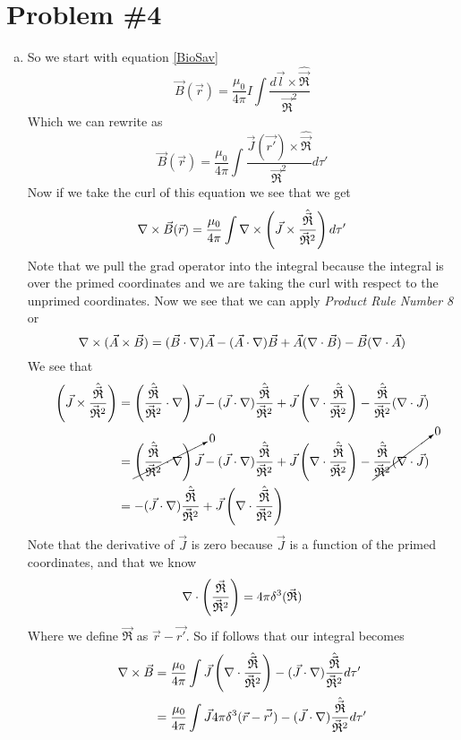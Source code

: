 \documentclass[11pt]{article}
\numberwithin{equation}{section}
\newcommand{\grad}{\bold\nabla}
\newcommand{\scrptR}{\vec{\mathfrak{R}}}
\begin{document}
\section{Problem \#4}
\begin{enumerate}[(a)]
\item
So we start with equation \ref{BioSav}
$$\vec{B}(\vec{r}) = \frac{\mu_0}{4\pi} I\int \frac{d\vec{l}\times\hat{\scrptR}}{\scrptR^2}$$
Which we can rewrite as
$$\vec{B}(\vec{r}) = \frac{\mu_0}{4\pi}\int\frac{\vec{J}(\vec{r'})\times\hat{\scrptR}}{\scrptR^2}d\tau'$$
Now if we take the curl of this equation we see that we get 
$$\grad\times\vec{B}(\vec{r}) = \frac{\mu_0}{4\pi}\int\grad\times\left(\vec{J}\times\frac{\hat{\scrptR}}{\scrptR^2}\right)d\tau'$$
Note that we pull the grad operator into the integral because the integral is over the primed coordinates and we are taking the curl with respect to the unprimed coordinates. Now we see that we can apply \emph{Product Rule Number 8} or
$$\grad\times(\vec{A}\times\vec{B}) = (\vec{B}\cdot\grad)\vec{A}-(\vec{A}\cdot\grad)\vec{B} + \vec{A}(\grad\cdot\vec{B})-\vec{B}(\grad\cdot\vec{A})$$
We see that
\begin{align*}
\left(\vec{J}\times\frac{\hat{\scrptR}}{\scrptR^2}\right) &= \left(\frac{\hat{\scrptR}}{\scrptR^2}\cdot\grad\right)\vec{J}-(\vec{J}\cdot\grad)\frac{\hat{\scrptR}}{\scrptR^2} + \vec{J}\left(\grad\cdot\frac{\hat{\scrptR}}{\scrptR^2}\right)-\frac{\hat{\scrptR}}{\scrptR^2}(\grad\cdot\vec{J})\\
&= \cancelto{0}{\left(\frac{\hat{\scrptR}}{\scrptR^2}\cdot\grad\right)\vec{J}}-(\vec{J}\cdot\grad)\frac{\hat{\scrptR}}{\scrptR^2} + \vec{J}\left(\grad\cdot\frac{\hat{\scrptR}}{\scrptR^2}\right)-\cancelto{0}{\frac{\hat{\scrptR}}{\scrptR^2}(\grad\cdot\vec{J})}\\
&= -(\vec{J}\cdot\grad)\frac{\hat{\scrptR}}{\scrptR^2} + \vec{J}\left(\grad\cdot\frac{\hat{\scrptR}}{\scrptR^2}\right)
\end{align*}
Note that the derivative of $\vec{J}$ is zero because $\vec{J}$ is a function of the primed coordinates, and that we know
$$\grad\cdot\left(\frac{\scrptR}{\scrptR^2}\right) = 4\pi\delta^3(\scrptR)$$
Where we define $\scrptR$ as $\vec{r} - \vec{r'}$. So if follows that our integral becomes
\begin{align*}
\grad\times\vec{B} &= \frac{\mu_0}{4\pi}\int \vec{J}\left(\grad\cdot\frac{\hat{\scrptR}}{\scrptR^2}\right)-(\vec{J}\cdot\grad)\frac{\hat{\scrptR}}{\scrptR^2}d\tau'\\
&= \frac{\mu_0}{4\pi}\int \vec{J}4\pi\delta^3(\vec{r}-\vec{r'})-(\vec{J}\cdot\grad)\frac{\hat{\scrptR}}{\scrptR^2}d\tau'\\

\end{align*}
\end{enumerate}
\end{document}
